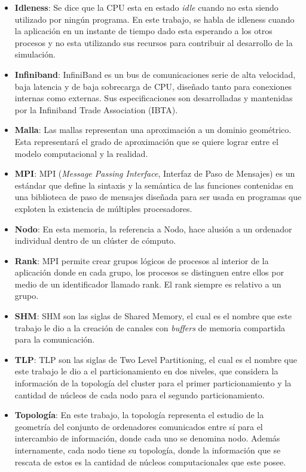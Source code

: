 \begin{itemize}
    \item \textbf{Idleness}: Se dice que la CPU esta en estado \textit{idle} cuando no esta siendo utilizado por ningún programa. En este trabajo, se habla de idleness cuando la aplicación en un instante de tiempo dado esta esperando a los otros procesos y no esta utilizando sus recursos para contribuir al desarrollo de la simulación.
    \item \textbf{Infiniband}: InfiniBand es un bus de comunicaciones serie de alta velocidad, baja latencia y de baja sobrecarga de CPU, diseñado tanto para conexiones internas como externas. Sus especificaciones son desarrolladas y mantenidas por la Infiniband Trade Association (IBTA).
    \item \textbf{Malla}: Las mallas representan una aproximación a un dominio geométrico. Esta representará el grado de aproximación que se quiere lograr entre el modelo computacional y la realidad.
    \item \textbf{MPI}: MPI (\textit{Message Passing Interface}, Interfaz de Paso de Mensajes) es un estándar que define la sintaxis y la semántica de las funciones contenidas en una biblioteca de paso de mensajes diseñada para ser usada en programas que exploten la existencia de múltiples procesadores.
    \item \textbf{Nodo}: En esta memoria, la referencia a Nodo, hace alusión a un ordenador individual dentro de un clúster de cómputo.
    \item \textbf{Rank}: MPI permite crear grupos lógicos de procesos al interior de la aplicación donde en cada grupo, los procesos se distinguen entre ellos por medio de un identificador llamado rank. El rank siempre es relativo a un grupo.
    \item \textbf{SHM}: SHM son las siglas de Shared Memory, el cual es el nombre que este trabajo le dio a la creación de canales con \textit{buffers} de memoria compartida para la comunicación.
    \item \textbf{TLP}: TLP son las siglas de Two Level Partitioning, el cual es el nombre que este trabajo le dio a el particionamiento en dos niveles, que considera la información de la topología del cluster para el primer particionamiento y la cantidad de núcleos de cada nodo para el segundo particionamiento.
    \item \textbf{Topología}: En este trabajo, la topología representa el estudio de la geometría del conjunto de ordenadores comunicados entre sí para el intercambio de información, donde cada uno se denomina nodo. Además internamente, cada nodo tiene su topología, donde la información que se rescata de estos es la cantidad de núcleos computacionales que este posee.
\end{itemize}